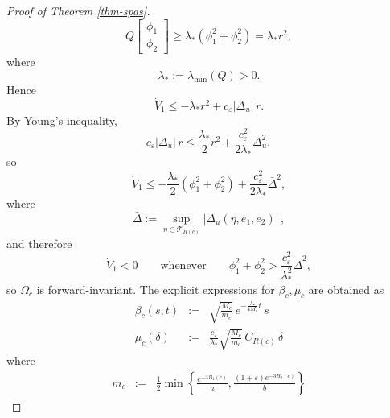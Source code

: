 \documentclass[journal,twoside,web]{ieeecolor}
\begin{document}
\begin{proof}[Proof of Theorem \ref{thm-spas}]
\begin{equation}
Q
\begin{bmatrix}\phi_1\\ \phi_2\end{bmatrix}
\ge \lambda_*(\phi_1^2+\phi_2^2)=\lambda_* r^2,
\end{equation}
where
\begin{equation}
\lambda_*:=\lambda_{\min}(Q)>0.
\end{equation}
Hence
\begin{equation}
\dot V_1\le -\lambda_* r^2+c_\varepsilon |\Delta_u|\,r.
\end{equation}
By Young’s inequality,
\begin{equation}
c_\varepsilon |\Delta_u|\,r
\le \frac{\lambda_*}{2}r^2+\frac{c_\varepsilon^2}{2\lambda_*}\Delta_u^2,
\end{equation}
so
\begin{equation}
\dot V_1
\le
-\frac{\lambda_*}{2}(\phi_1^2+\phi_2^2)
+\frac{c_\varepsilon^2}{2\lambda_*}\bar\Delta^2,
\end{equation}
where
\begin{equation}
\bar\Delta := \sup_{\eta\in\mathcal T_{R(c)}}|\Delta_u(\eta,e_1,e_2)|\,,
\end{equation}
and therefore
\begin{equation}
\dot V_1<0
\qquad\text{whenever}\qquad
\phi_1^2+\phi_2^2>\frac{c_\varepsilon^2}{\lambda_*^2}\bar\Delta^2,
\end{equation}
so $\Omega_c$ is forward-invariant. 
The explicit expressions for $\beta_c, \mu_c$ are obtained as
\begin{eqnarray}
\beta_c(s,t)&:=&\sqrt{\frac{M_c}{m_c}}\,e^{-\frac{\lambda_*}{4M_c}t}\,s
\\
\mu_c(\delta)&:=&\frac{c_\varepsilon}{\lambda_*}\sqrt{\frac{M_c}{m_c}}\,C_{R(c)}\,\delta
\end{eqnarray}
where 
\begin{eqnarray}
m_c &:=&\frac{1}{2}\min\!\left\{\frac{e^{-3B_1(c)}}{a},\frac{(1+\varepsilon)e^{-3B_2(c)}}{b}\right\}

\end{eqnarray}
\end{proof}
\end{document}
